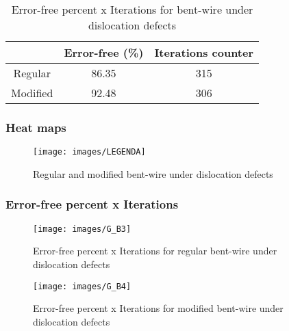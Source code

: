 \begin{table}[h]
\begin{center}
\begin{tabular}{|c|c|c|}
\hline
 & Error-free (\%) & Iterations counter \\
\hline
 Regular & 86.35 & 315 \\
\hline
 Modified & 92.48 & 306 \\
\hline

\end{tabular}
\caption{Error-free percent x Iterations for bent-wire under dislocation defects}
\end{center}
\end{table}

\pagebreak
\subsubsection{Heat maps}

\begin{figure}[h]
\center
{}
\hfill
{}
\linebreak
{\texttt{[image: images/LEGENDA]}
}
\caption{Regular and modified bent-wire under dislocation defects}
\label{figure:bentwire_t2}
\end{figure}

\subsubsection{Error-free percent x Iterations}

\begin{figure}[h!]
\center
\texttt{[image: images/G\_B3]}
\caption{Error-free percent x Iterations for regular bent-wire under dislocation defects}
\label{figure:bentwire_reg_gt2}
\end{figure}

\begin{figure}[h!]
\center
\texttt{[image: images/G\_B4]}
\caption{Error-free percent x Iterations for modified bent-wire under dislocation defects}
\label{figure:bentwire_mod_gt2}
\end{figure}
\pagebreak
